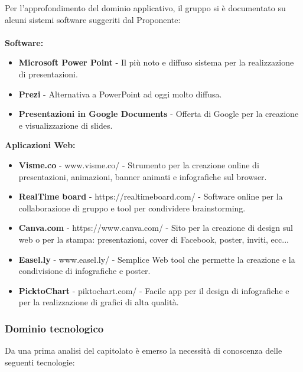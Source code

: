 Per l’approfondimento del dominio applicativo, il gruppo si è documentato su alcuni sistemi software suggeriti dal Proponente:\\
\\
\textbf{Software:}
\begin{itemize}
	\item \textbf{Microsoft Power Point} - Il più noto e diffuso sistema per la realizzazione di presentazioni.
	\item \textbf{Prezi} - Alternativa a PowerPoint ad oggi molto diffusa.
	\item \textbf{Presentazioni in Google Documents} - Offerta di Google per la creazione e visualizzazione di slides.
\end{itemize}
\textbf{Aplicazioni Web:}
\begin{itemize}
	\item \textbf{Visme.co} - www.visme.co/ - Strumento per la creazione online di presentazioni, animazioni, banner animati e infografiche sul browser.
	\item \textbf{RealTime board} - https://realtimeboard.com/ - Software online per la collaborazione di gruppo e tool per condividere brainstorming.
	\item \textbf{Canva.com} - https://www.canva.com/ - Sito per la creazione di design sul web o per la stampa: presentazioni, cover di Facebook, poster, inviti, ecc...
	\item \textbf{Easel.ly} - www.easel.ly/ - Semplice Web tool che permette la creazione e la condivisione di infografiche e poster.
	\item \textbf{PicktoChart} - piktochart.com/ - Facile app per il design di infografiche e per la realizzazione di grafici di alta qualità.
\end{itemize}

\subsubsection{Dominio tecnologico}

Da una prima analisi del capitolato è emerso la necessità di conoscenza delle seguenti tecnologie:

